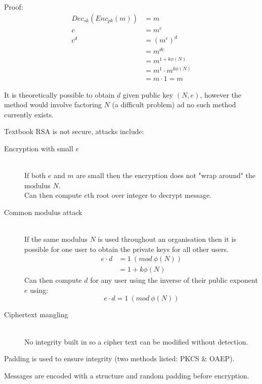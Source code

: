 \documentclass[a4paper]{article}
\begin{document}
Proof:
\begin{align*}
  Dec_{sk}(Enc_{pk}(m)) &= m \\
                      c &= m^{e} \\
                  c^{d} &= (m^{e})^{d} \\
                        &= m^{de} \\
                        &= m^{1 + k\phi(N)} \\
                        &= m^{1} \cdot m^{k\phi(N)} \\
                        &= m \cdot 1 = m
\end{align*}

It is theoretically possible to obtain $d$ given public key $(N, e)$, however
the method would involve factoring $N$ (a difficult problem) ad no such method
currently exists.

Textbook RSA is not secure, attacks include:
\begin{description}
  \item[Encryption with small $e$] \hfill \\
    If both $e$ and $m$ are small then the encryption does not "wrap around" the
    modulus $N$. \\
    Can then compute $e$th root over integer to decrypt message.

  \item[Common modulus attack] \hfill \\
    If the same modulus $N$ is used throughout an organisation then it is
    possible for one user to obtain the private keys for all other users.
    \begin{align*}
      e \cdot d &= 1 \: (mod \: \phi(N)) \\
                &= 1 + k\phi(N)
    \end{align*}
    Can then compute $d$ for any user using the inverse of their public exponent
    $e$ using:
    \[
      e \cdot d = 1 \: (mod \: \phi(N))
    \]

  \item[Ciphertext mangling] \hfill \\
    No integrity built in so a cipher text can be modified without detection.

\end{description}

Padding is used to ensure integrity (two methods listed: PKCS \& OAEP).

Messages are encoded with a structure and random padding before encryption.
\end{document}
